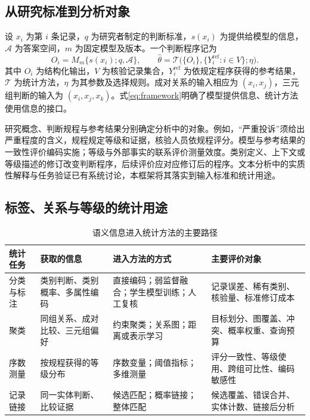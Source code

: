 \documentclass[UTF8,a4paper,zihao=-4,fontset=fandol]{ctexart}
\begin{document}
\subsection{从研究标准到分析对象}

设 $x_i$ 为第 $i$ 条记录，$q$ 为研究者制定的判断标准，$s(x_i)$ 为提供给模型的信息，$\mathcal A$ 为答案空间，$m$ 为固定模型及版本。一个判断程序记为
\begin{equation}
 O_i=M_m\{s(x_i);q,\mathcal A\},\qquad
 \widehat\theta=\mathcal T\bigl(\{O_i\},\{Y_i^{\mathrm{ref}}:i\in V\};\eta\bigr).
 \label{eq:framework}
\end{equation}
其中 $O_i$ 为结构化输出，$V$ 为核验记录集合，$Y_i^{\mathrm{ref}}$ 为依规定程序获得的参考结果，$\mathcal T$ 为统计方法，$\eta$ 为其参数及选择规则。成对关系的输入相应为 $(x_i,x_j)$，三元组判断的输入为 $(x_i,x_j,x_k)$。式\eqref{eq:framework}明确了模型提供信息、统计方法使用信息的接口。

研究概念、判断规程与参考结果分别确定分析中的对象。例如，“严重投诉”须给出严重程度的含义，规程规定等级和证据，核验人员依规程评分。模型与参考结果的一致性评价编码实施；等级与外部事实的联系评价测量效度。类别定义、上下文或等级描述的修订改变判断程序，后续评价应对应修订后的程序。文本分析中的实质性解释与任务验证已有系统讨论\citep{grimmer2013}，本框架将其落实到输入标准和统计用途。

\subsection{标签、关系与等级的统计用途}

\begin{table}[htbp]
\centering\small
\caption{语义信息进入统计方法的主要路径}\label{tab:framework}
\begin{tabularx}{\textwidth}{@{}L{1.7cm}L{2.7cm}YY@{}}
\toprule
统计任务 & 获取的信息 & 进入方法的方式 & 主要评价对象 \\
\midrule
分类与标注 & 类别判断、类别概率、多属性编码 & 直接编码；弱监督融合；学生模型训练；人工复核 & 记录误差、稀有类别、核验量、标准修订成本 \\
聚类 & 同组关系、成对比较、三元组偏好 & 约束聚类；关系图；距离或表示学习 & 目标划分、图覆盖、冲突、概率权重、查询预算 \\
序数测量 & 按规程获得的等级分布 & 序数变量；阈值指标；多维测量 & 评分一致性、等级使用、跨组可比性、编码敏感性 \\
记录链接 & 同一实体判断、比较证据 & 候选匹配；概率链接；整体匹配 & 候选覆盖、错误合并、实体计数、链接后分析 \\
\bottomrule
\end{tabularx}
\end{table}
\end{document}
